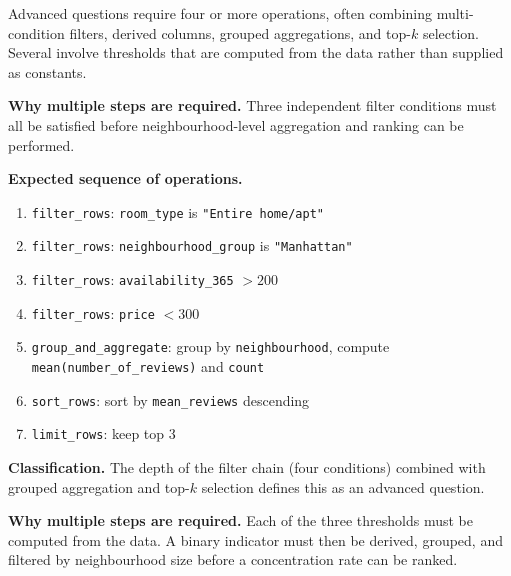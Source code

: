 Advanced questions require four or more operations, often combining multi-condition filters, derived columns, grouped aggregations, and top-$k$ selection. Several involve thresholds that are computed from the data rather than supplied as constants.


\textbf{Why multiple steps are required.}
Three independent filter conditions must all be satisfied before neighbourhood-level aggregation and ranking can be performed.

\textbf{Expected sequence of operations.}
\begin{enumerate}
  \item \texttt{filter\_rows}: \texttt{room\_type} is \texttt{"Entire home/apt"}
  \item \texttt{filter\_rows}: \texttt{neighbourhood\_group} is
    \texttt{"Manhattan"}
  \item \texttt{filter\_rows}: \texttt{availability\_365} $> 200$
  \item \texttt{filter\_rows}: \texttt{price} $< 300$
  \item \texttt{group\_and\_aggregate}: group by \texttt{neighbourhood}, compute
    \texttt{mean(number\_of\_reviews)} and \texttt{count}
  \item \texttt{sort\_rows}: sort by \texttt{mean\_reviews} descending
  \item \texttt{limit\_rows}: keep top 3
\end{enumerate}

\textbf{Classification.}
The depth of the filter chain (four conditions) combined with grouped aggregation and top-$k$ selection defines this as an advanced question.



\textbf{Why multiple steps are required.}
Each of the three thresholds must be computed from the data. A binary indicator must then be derived, grouped, and filtered by neighbourhood size before a concentration rate can be ranked.


